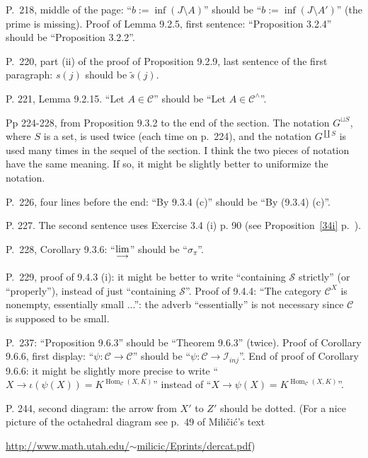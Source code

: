 \documentclass[12pt]{article}
\theoremstyle{remark}
\theoremstyle{definition}
\newcommand{\C}{\mathcal C}
\newcommand{\ilim}{\operatornamewithlimits{\underset{\longrightarrow}{lim}}}
\DeclareMathOperator{\Hom}{Hom}%
\begin{document}
\noindent P.~218, middle of the page: ``$b:=\inf(J\setminus A)$'' should be ``$b:=\inf(J\setminus A')$'' (the prime is missing). Proof of Lemma 9.2.5, first sentence: ``Proposition 3.2.4'' should be ``Proposition 3.2.2''.

\noindent P.~220, part (ii) of the proof of Proposition 9.2.9, last sentence of the first paragraph: $s(j)$ should be $\tilde s(j)$.

\noindent P. 221, Lemma 9.2.15. ``Let $A\in\C$'' should be ``Let $A\in\C^\wedge$''.

\noindent Pp 224-228, from Proposition 9.3.2 to the end of the section. The notation $G^{\sqcup S}$, where $S$ is a set, is used twice (each time on p.~224), and the notation $G^{\coprod S}$ is used many times in the sequel of the section. I think the two pieces of notation have the same meaning. If so, it might be slightly better to uniformize the notation.

\noindent P.~226, four lines before the end: ``By 9.3.4 (c)'' should be ``By (9.3.4) (c)''.

\noindent P. 227. The second sentence uses Exercise 3.4 (i) p. 90 (see Proposition~\ref{34i} p.~\pageref{34i}).

\noindent P.~228, Corollary 9.3.6: ``$\ilim$'' should be ``$\sigma_\pi$''.

\noindent P.~229, proof of 9.4.3 (i): it might be better to write ``containing $\mathcal S$ strictly'' (or ``properly''), instead of just ``containing $\mathcal S$''. Proof of 9.4.4: ``The category $\C^X$ is nonempty, essentially small ...'': the adverb ``essentially'' is not necessary since $\C$ is supposed to be small.

\noindent P.~237: ``Proposition 9.6.3'' should be ``Theorem 9.6.3'' (twice). Proof of Corollary 9.6.6, first display: ``$\psi:\C\to\C$'' should be ``$\psi:\C\to\mathcal I_{inj}$''. %
End of proof of Corollary 9.6.6: it might be slightly more precise to write ``$X\to\iota(\psi(X))=K^{\Hom_\C(X,K)}$'' instead of ``$X\to\psi(X)=K^{\Hom_\C(X,K)}$''.

\noindent P. 244, second diagram: the arrow from $X'$ to $Z'$ should be dotted. (For a nice picture of the octahedral diagram see p.~49 of Mili\v{c}i\'c's text 

\href{http://www.math.utah.edu/~milicic/Eprints/dercat.pdf}{http://www.math.utah.edu/$\sim$milicic/Eprints/dercat.pdf})
\end{document}
